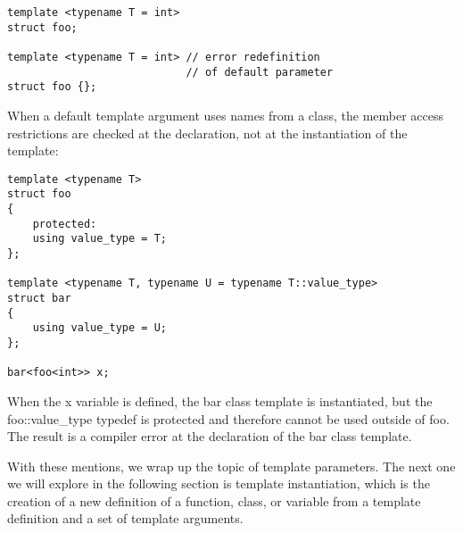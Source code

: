 \begin{lstlisting}[style=styleCXX]
template <typename T = int>
struct foo;

template <typename T = int> // error redefinition
                            // of default parameter
struct foo {};
\end{lstlisting}

When a default template argument uses names from a class, the member access restrictions are checked at the declaration, not at the instantiation of the template:

\begin{lstlisting}[style=styleCXX]
template <typename T>
struct foo
{
	protected:
	using value_type = T;
};

template <typename T, typename U = typename T::value_type>
struct bar
{
	using value_type = U;
};

bar<foo<int>> x;
\end{lstlisting}

When the x variable is defined, the bar class template is instantiated, but the foo::value\_type typedef is protected and therefore cannot be used outside of foo. The result is a compiler error at the declaration of the bar class template.

With these mentions, we wrap up the topic of template parameters. The next one we will explore in the following section is template instantiation, which is the creation of a new definition of a function, class, or variable from a template definition and a set of template arguments.








